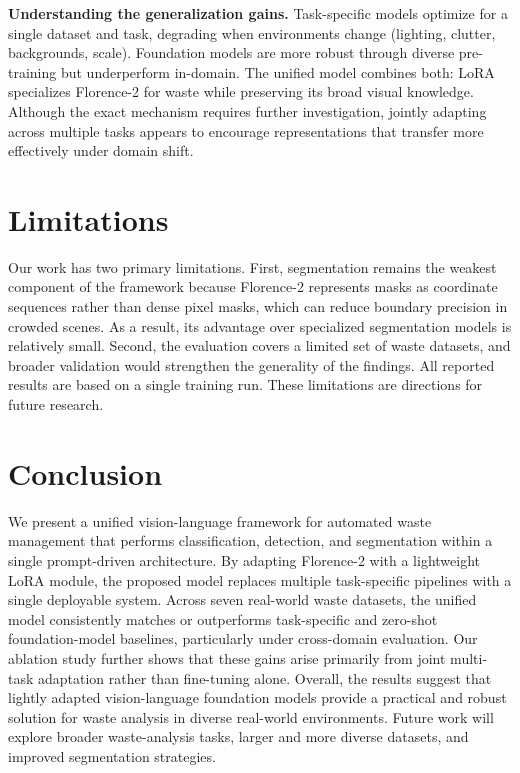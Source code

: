 \documentclass[conference]{IEEEtran}
\begin{document}
\textbf{Understanding the generalization gains.}
Task-specific models optimize for a single dataset and task, degrading when
environments change (lighting, clutter, backgrounds, scale). Foundation models are
more robust through diverse pre-training but underperform in-domain. The unified
model combines both: LoRA specializes Florence-2 for waste while preserving its
broad visual knowledge. Although the exact mechanism requires further investigation,
jointly adapting across multiple tasks appears to encourage representations that
transfer more effectively under domain shift.

\section{Limitations}
Our work has two primary limitations. First, segmentation remains the weakest component of the framework because Florence-2 represents masks as coordinate sequences rather than dense pixel masks, which can reduce boundary precision in crowded scenes. As a result, its advantage over specialized segmentation models is relatively small. Second, the evaluation covers a limited set of waste datasets, and broader validation would strengthen the generality of the findings. All reported results are based on a single training run.
These limitations are directions for future research.

\section{Conclusion}
We present a unified vision-language framework for automated waste management that performs classification, detection, and segmentation within a single prompt-driven architecture. By adapting Florence-2 with a lightweight LoRA module, the proposed model replaces multiple task-specific pipelines with a single deployable system. Across seven real-world waste datasets, the unified model consistently matches or outperforms task-specific and zero-shot foundation-model baselines, particularly under cross-domain evaluation. Our ablation study further shows that these gains arise primarily from joint multi-task adaptation rather than fine-tuning alone. Overall, the results suggest that lightly adapted vision-language foundation models provide a practical and robust solution for waste analysis in diverse real-world environments. Future work will explore broader waste-analysis tasks, larger and more diverse datasets, and improved segmentation strategies.
\end{document}
